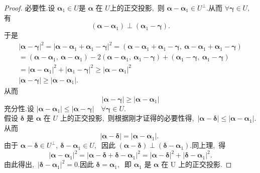 \begin{proof}
	必要性.设 $ \boldsymbol{\alpha}_{1} \in U  $是  $\boldsymbol{\alpha} $ 在  $U  $上的正交投影,\  则 $ \boldsymbol{\alpha}-\boldsymbol{\alpha}_{1} \in U^{\perp} .$从而 $ \forall \boldsymbol{\gamma} \in U ,\  $有
	$$\left(\boldsymbol{\alpha}-\boldsymbol{\alpha}_{1}\right) \perp\left(\boldsymbol{\alpha}_{1}-\boldsymbol{\gamma}\right) .$$
	于是
	$$\begin{array}{l}
		|\boldsymbol{\alpha}-\boldsymbol{\gamma}|^{2}=\left|\boldsymbol{\alpha}-\boldsymbol{\alpha}_{1}+\boldsymbol{\alpha}_{1}-\boldsymbol{\gamma}\right|^{2}=\left(\boldsymbol{\alpha}-\boldsymbol{\alpha}_{1}+\boldsymbol{\alpha}_{1}-\boldsymbol{\gamma},\  \boldsymbol{\alpha}-\boldsymbol{\alpha}_{1}+\boldsymbol{\alpha}_{1}-\boldsymbol{\gamma}\right) \\
		=\left(\boldsymbol{\alpha}-\boldsymbol{\alpha}_{1},\  \boldsymbol{\alpha}-\boldsymbol{\alpha}_{1}\right)-2\left(\boldsymbol{\alpha}-\boldsymbol{\alpha}_{1},\  \boldsymbol{\alpha}_{1}-\boldsymbol{\gamma}\right)+\left(\boldsymbol{\alpha}_{1}-\boldsymbol{\gamma},\  \boldsymbol{\alpha}_{1}-\boldsymbol{\gamma}\right) \\
		=\left|\boldsymbol{\alpha}-\boldsymbol{\alpha}_{1}\right|^{2}+\left|\boldsymbol{\alpha}_{1}-\boldsymbol{\gamma}\right|^{2} \geqslant\left|\boldsymbol{\alpha}-\boldsymbol{\alpha}_{1}\right|^{2} \\
		|\boldsymbol{\alpha}-\boldsymbol{\gamma}| \geqslant\left|\boldsymbol{\alpha}-\boldsymbol{\alpha}_{1}\right| .
	\end{array}$$
	从而
	$$|\boldsymbol{\alpha}-\boldsymbol{\gamma}|\geqslant|\boldsymbol{\alpha}-\boldsymbol{\alpha}_1|$$
	充分性.设 $ \left|\boldsymbol{\alpha}-\boldsymbol{\alpha}_{1}\right| \leqslant|\boldsymbol{\alpha}-\boldsymbol{\gamma}| \quad \forall \boldsymbol{\gamma} \in U  .$\\
	假设 $ \boldsymbol{\delta} $ 是 $ \boldsymbol{\alpha} $ 在 $ U $ 上的正交投影,\  则根据刚才证得的必要性得,\  $ |\boldsymbol{\alpha}-\boldsymbol{\delta}| \leqslant\left|\boldsymbol{\alpha}-\boldsymbol{\alpha}_{1}\right| .$从而
	$$|\boldsymbol{\alpha}-\boldsymbol{\delta}|=\left|\boldsymbol{\alpha}-\boldsymbol{\alpha}_{1}\right| \text {. }$$
	由于 $ \boldsymbol{\alpha}-\boldsymbol{\delta} \in U^{\perp},\  \boldsymbol{\delta}-\boldsymbol{\alpha}_{1} \in U ,\ $ 因此 $ (\boldsymbol{\alpha}-\boldsymbol{\delta}) \perp\left(\boldsymbol{\delta}-\boldsymbol{\alpha}_{1}\right) .$同上理,\  得
	$$\left|\boldsymbol{\alpha}-\boldsymbol{\alpha}_{1}\right|^{2}=\left|\boldsymbol{\alpha}-\boldsymbol{\delta}+\boldsymbol{\delta}-\boldsymbol{\alpha}_{1}\right|^{2}=|\boldsymbol{\alpha}-\boldsymbol{\delta}|^{2}+\left|\boldsymbol{\delta}-\boldsymbol{\alpha}_{1}\right|^{2} .$$
	由此得出,\ $  \left|\boldsymbol{\delta}-\boldsymbol{\alpha}_{1}\right|^{2}=0  .$因此 $ \boldsymbol{\delta}=\boldsymbol{\alpha}_{1} ,\ $ 即 $ \boldsymbol{\alpha}_{1} $ 是 $ \boldsymbol{\alpha} $ 在  U  上的正交投影.
\end{proof}
